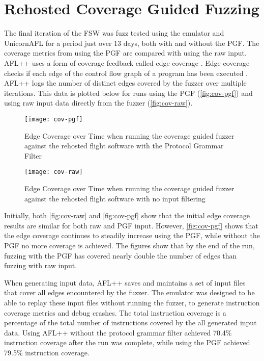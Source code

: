 \documentclass[../report.tex]{subfiles}
\begin{document}
\section{Rehosted Coverage Guided Fuzzing}

The final iteration of the FSW was fuzz tested using the emulator and
UnicornAFL for a period just over 13 days, both with and without the PGF. The
coverage metrics from using the PGF are compared with using the raw input.
AFL++ uses a form of coverage feedback called edge coverage
\citep{AFLplusplus}. Edge coverage checks if each edge of the control flow
graph of a program has been executed \citep{edgecoverage}. AFL++ logs the
number of distinct edges covered by the fuzzer over multiple iterations. This
data is plotted below for runs using the PGF (\autoref{fig:cov-pgf}) and using
raw input data directly from the fuzzer (\autoref{fig:cov-raw}).

\begin{figure}[H]
    \centering
    \texttt{[image: cov-pgf]}
    \caption{Edge Coverage over Time when running the coverage guided fuzzer
    against the rehosted flight software with the Protocol Grammar Filter}
    \label{fig:cov-pgf}
\end{figure}

\begin{figure}[H]
    \centering
    \texttt{[image: cov-raw]}
    \caption{Edge Coverage over Time when running the coverage guided fuzzer
    against the rehosted flight software with no input filtering}
    \label{fig:cov-raw}
\end{figure}

Initially, both \autoref{fig:cov-raw} and \autoref{fig:cov-pgf} show that the
initial edge coverage results are similar for both raw and PGF input. However,
\autoref{fig:cov-pgf} shows that the edge coverage continues to steadily
increase using the PGF, while without the PGF no more coverage is achieved. The
figures show that by the end of the run, fuzzing with the PGF has covered
nearly double the number of edges than fuzzing with raw input.

When generating input data, AFL++ saves and maintains a set of input files that
cover all edges encountered by the fuzzer. The emulator was designed to be able
to replay these input files without running the fuzzer, to generate instruction
coverage metrics and debug crashes. The total instruction coverage is a
percentage of the total number of instructions covered by the all generated
input data. Using AFL++ without the protocol grammar filter achieved 70.4\%
instruction coverage after the run was complete, while using the PGF achieved
79.5\% instruction coverage.
\end{document}
